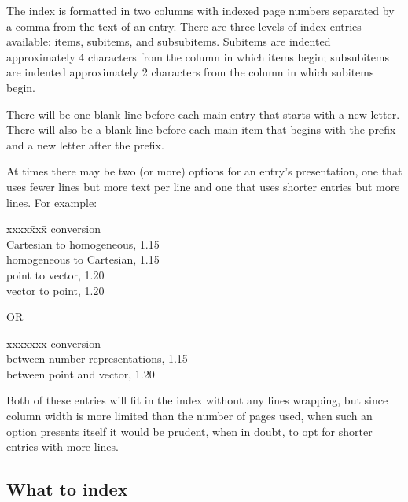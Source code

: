 \documentclass[11pt]{article}
\newenvironment{indexex}{\begin{tabbing}
xxxx\=xxx\=\kill}{\end{tabbing}}
\begin{document}
The index is formatted in two columns with indexed page numbers 
separated by a comma from the 
text of an entry.  There are three levels of index entries available:
items, subitems, and subsubitems.  Subitems are indented approximately
4 characters from the column in which items begin; subsubitems are indented
approximately 2 characters from the column in which subitems begin. 

There will be one blank line before each main entry that starts with a new 
letter.  There will also be a blank line before each main item that begins
with the  prefix and a new letter after the prefix.

At times there may be two (or more) options for an entry's presentation, one
that uses fewer lines but more text per line and one that uses shorter
entries but more lines.  For example:
        \begin{indexex}
        conversion  \\
        \> Cartesian to homogeneous,      1.15 \\
        \> homogeneous to Cartesian,      1.15 \\
        \> point to vector,               1.20 \\
        \> vector to point,               1.20 
        \end{indexex}

OR
        \begin{indexex}
        conversion  \\
        \> between number representations, 1.15 \\
        \> between point and vector,       1.20 
        \end{indexex}

Both of these entries will fit in the index without any lines wrapping, but 
since column width is more limited than the number of pages used, when such 
an option presents itself it would be prudent, when in doubt, to opt for 
shorter entries with more lines.%

\subsection{What to index}
\label{what_to_index}
\end{document}
